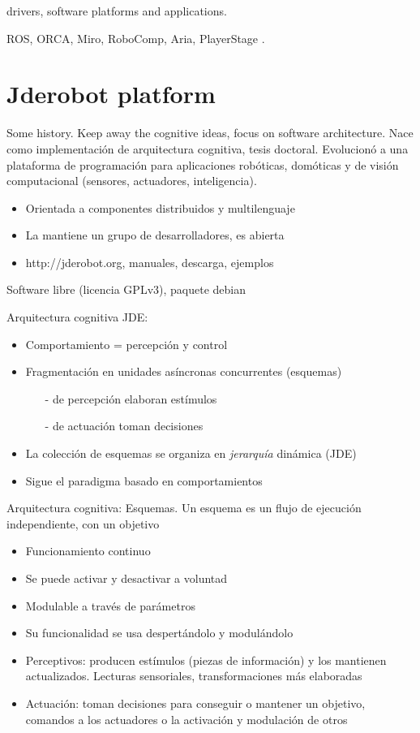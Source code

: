 \documentclass[twocolumn]{svjour3}          %
\begin{document}
drivers, software platforms and applications.

ROS, ORCA, Miro, RoboComp, Aria, PlayerStage \cite{Gerkey03,vaughan2007}.

\section{Jderobot platform}
\label{sec:jderobot}

Some history. Keep away the cognitive ideas, focus on software architecture. Nace como implementación de arquitectura cognitiva, tesis doctoral. Evolucionó a una plataforma de programación para aplicaciones robóticas, domóticas y de visión computacional (sensores, actuadores, inteligencia).

\begin{itemize}
\item Orientada a componentes distribuidos y multilenguaje
\item La mantiene un grupo de desarrolladores, es abierta
\item {http://jderobot.org}, manuales, descarga, ejemplos
\end{itemize}
Software libre (licencia GPLv3), paquete debian


Arquitectura cognitiva JDE:
\begin{itemize}
\item Comportamiento = {percepción} y {control}
\item Fragmentación en unidades asíncronas concurrentes (esquemas)
\begin{itemize}
\item[-] de percepción elaboran estímulos
\item[-] de actuación toman decisiones
\end{itemize}
\item La colección de esquemas se organiza en \textit{jerarquía} dinámica (JDE)
\item Sigue el paradigma basado en comportamientos
\end{itemize}

Arquitectura cognitiva: Esquemas.
Un {esquema} es un flujo de ejecución independiente, con un objetivo
\begin{itemize}
\item Funcionamiento continuo
\item Se puede activar y desactivar a voluntad
\item Modulable a través de parámetros
\item Su funcionalidad se usa despertándolo y modulándolo
\item {Perceptivos}: producen estímulos (piezas de información) y los mantienen actualizados. Lecturas sensoriales, transformaciones más elaboradas 
\item {Actuación}: toman decisiones para conseguir o mantener un objetivo, comandos a los actuadores o la activación y modulación de otros 
\end{itemize}
\end{document}
